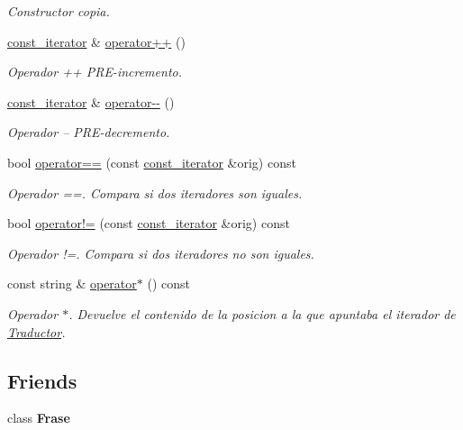 \begin{DoxyCompactItemize}
\begin{DoxyCompactList}\small\item\em Constructor copia. \end{DoxyCompactList}\item 
\hyperlink{class_frase_1_1const__iterator}{const\+\_\+iterator} \& \hyperlink{class_frase_1_1const__iterator_abc3741be558905a426fd8533525d1a68}{operator++} ()
\begin{DoxyCompactList}\small\item\em Operador ++ P\+R\+E-\/incremento. \end{DoxyCompactList}\item 
\hyperlink{class_frase_1_1const__iterator}{const\+\_\+iterator} \& \hyperlink{class_frase_1_1const__iterator_a66bb41ae55e49288accaa29283b50473}{operator-\/-\/} ()
\begin{DoxyCompactList}\small\item\em Operador -- P\+R\+E-\/decremento. \end{DoxyCompactList}\item 
bool \hyperlink{class_frase_1_1const__iterator_a1e11b9e6e0fc92fa429ff7c044c37d0e}{operator==} (const \hyperlink{class_frase_1_1const__iterator}{const\+\_\+iterator} \&orig) const 
\begin{DoxyCompactList}\small\item\em Operador ==. Compara si dos iteradores son iguales. \end{DoxyCompactList}\item 
bool \hyperlink{class_frase_1_1const__iterator_a185f28c53eadd53591417360d8191655}{operator!=} (const \hyperlink{class_frase_1_1const__iterator}{const\+\_\+iterator} \&orig) const 
\begin{DoxyCompactList}\small\item\em Operador !=. Compara si dos iteradores no son iguales. \end{DoxyCompactList}\item 
const string \& \hyperlink{class_frase_1_1const__iterator_a1e2df0ebd219c244bf4591c6609021c9}{operator$\ast$} () const 
\begin{DoxyCompactList}\small\item\em Operador $\ast$. Devuelve el contenido de la posicion a la que apuntaba el iterador de \hyperlink{class_traductor}{Traductor}. \end{DoxyCompactList}\end{DoxyCompactItemize}
\subsection*{Friends}
\begin{DoxyCompactItemize}
\item 
class {\bfseries Frase}\hypertarget{class_frase_1_1const__iterator_af82ae1ab9169f5d9193e289425f079ec}{}\label{class_frase_1_1const__iterator_af82ae1ab9169f5d9193e289425f079ec}

\end{DoxyCompactItemize}



